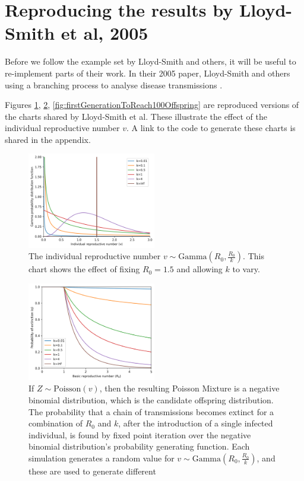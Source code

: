 \documentclass{article}
\begin{document}
\clearpage

\section{Reproducing the results by Lloyd-Smith et al, 2005}

Before we follow the example set by Lloyd-Smith and others, it will be useful to re-implement parts of their work. In their 2005 paper, Lloyd-Smith and others using a branching process to analyse disease transmissions \cite{LloydSmith2005}.

Figures \ref{fig:gamma(R0,R0/k)}, \ref{fig:probabilityOfExtinction}, \ref{fig:firstGenerationToReach100Offspring} are reproduced versions of the charts shared by Lloyd-Smith et al. These illustrate the effect of the individual reproductive number $ v $. A link to the code to generate these charts is shared in the appendix.

\begin{figure}[h!]
    \includegraphics[width=0.5\textwidth, center]{2a_gamma.png}
    \caption{The individual reproductive number $ v \sim \text{Gamma}(R_0, \frac{R_0}{k}) $. This chart shows the effect of fixing $ R_0=1.5 $ and allowing $ k $ to vary.}
    \label{fig:gamma(R0,R0/k)}
\end{figure}

\begin{figure}[h!]
    \includegraphics[width=0.5\textwidth, center]{2b_probabilityOfExtinction.png}
    \caption{If $ Z \sim \text{Poisson}(v) $, then the resulting Poisson Mixture is a negative binomial distribution, which is the candidate offspring distribution. The probability that a chain of transmissions becomes extinct for a combination of $R_0$ and $ k $, after the introduction of a single infected individual, is found by fixed point iteration over the negative binomial distribution's probability generating function. Each simulation generates a random value for $ v \sim \text{Gamma}(R_0, \frac{R_0}{k})$, and these are used to generate different }\label{fig:probabilityOfExtinction}
\end{figure}
\end{document}
